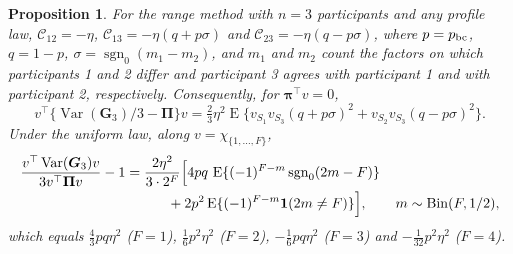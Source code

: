 \documentclass[12pt,a4paper]{article}
\newtheorem{proposition}{Proposition}
\theoremstyle{definition}
\theoremstyle{remark}\newtheorem{remark}{Remark}
\numberwithin{equation}{section}
\newcommand{\E}{\operatorname{E}}
\newcommand{\Var}{\operatorname{Var}}
\newcommand{\sg}{\operatorname{sgn}_0}
\begin{document}
\begin{proposition}\label{prop:supp-n3}
For the range method with $n=3$ participants and any profile law, $\mathcal C_{12}=-\eta$, $\mathcal C_{13}=-\eta(q+p\sigma)$ and $\mathcal C_{23}=-\eta(q-p\sigma)$, where $p=p_{\rm bc}$, $q=1-p$, $\sigma=\sg(m_1-m_2)$, and $m_1$ and $m_2$ count the factors on which participants 1 and 2 differ and participant 3 agrees with participant 1 and with participant 2, respectively. Consequently, for $\bm\pi^\top v=0$,
\begin{equation}\label{eq:supp-n3}
 v^\top\{\Var(\bm G_3)/3-\bm\Pi\}v
 =\tfrac23\eta^2\E\{v_{S_1}v_{S_3}(q+p\sigma)^2+v_{S_2}v_{S_3}(q-p\sigma)^2\}.
\end{equation}
Under the uniform law, along $v=\chi_{\{1,\ldots,F\}}$,
\begin{align}\label{eq:supp-n3-uniform}
 \frac{v^\top\Var(\bm G_3)v}{3v^\top\bm\Pi v}-1
 &=\frac{2\eta^2}{3\cdot2^{F}}
 \Big[4pq\,\E\{(-1)^{F-m}\sg(2m-F)\}\nonumber\\
 &\qquad\quad+2p^2\E\{(-1)^{F-m}\mathbf 1(2m\ne F)\}\Big],
 \qquad m\sim{\rm Bin}(F,1/2),
\end{align}
which equals $\tfrac43pq\eta^2$ ($F=1$), $\tfrac16p^2\eta^2$ ($F=2$), $-\tfrac16pq\eta^2$ ($F=3$) and $-\tfrac1{32}p^2\eta^2$ ($F=4$).
\end{proposition}
\end{document}
